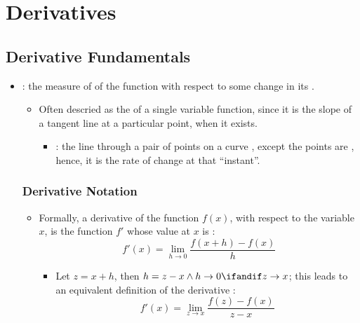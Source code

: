 \chapter{Derivatives}


\section{Derivative Fundamentals}
\begin{itemize}
  \item {}: the measure of  of the
    function  with respect to some change in its .
    \begin{itemize}
      \item Often descried as the  of a
        single variable function, since it is the slope of a tangent line at a
        particular point, when it exists.
        \begin{itemize}
          \item {}: the line through a pair of points on a curve
            , except the points are ,
            hence, it is the rate of change at that ``instant''.
        \end{itemize}

    \end{itemize}


  \subsection{Derivative Notation}
  \begin{itemize}
    \item Formally, a derivative of the function \( f(x) \), with respect to the
      variable  \( x \), is the function \( f' \) whose value at \( x \) is
      :
      \[
        f'(x) = \lim_{h \to 0} \frac{f(x+h) - f(x)}{h}
      \]
      \begin{itemize}
        \item Let \( z = x + h \), then \( h = z - x \land h \to 0 \ifandif z
            \to x \); this leads to an equivalent definition of the derivative
            :
            \[
              f'(x) = \lim_{z \to x} \frac{f(z) - f(x)}{z - x}
            \]
      \end{itemize}


\end{itemize}
\end{itemize}
